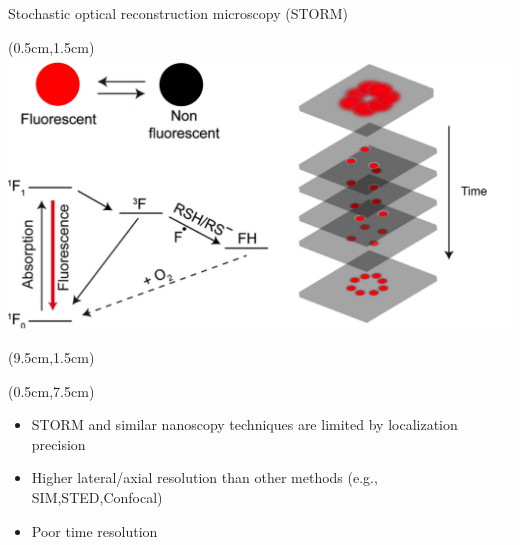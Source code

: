 \documentclass{beamer}					%
\begin{document}
\begin{frame}{Stochastic optical reconstruction microscopy (STORM)}
\begin{textblock*}{9cm}(0.5cm,1.5cm)
\includegraphics[width=\textwidth]{../../dissertation/dissertation/media/Intro-Cropped.png}
\end{textblock*}
\begin{textblock*}{5cm}(9.5cm,1.5cm)
\end{textblock*}
\begin{textblock*}{15cm}(0.5cm,7.5cm)
\begin{itemize}
\item STORM and similar nanoscopy techniques are limited by localization precision
\item Higher lateral/axial resolution than other methods (e.g., SIM,STED,Confocal)
\item Poor time resolution
\end{itemize}
\end{textblock*}
\end{frame}
\end{document}
